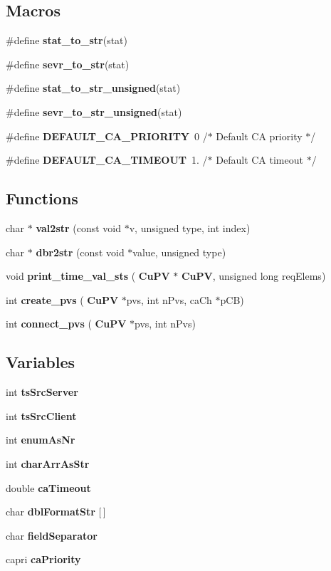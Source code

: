 \subsection*{Macros}
\begin{DoxyCompactItemize}
\item 
\#define \textbf{ stat\+\_\+to\+\_\+str}(stat)
\item 
\#define \textbf{ sevr\+\_\+to\+\_\+str}(stat)
\item 
\#define \textbf{ stat\+\_\+to\+\_\+str\+\_\+unsigned}(stat)
\item 
\#define \textbf{ sevr\+\_\+to\+\_\+str\+\_\+unsigned}(stat)
\item 
\#define \textbf{ D\+E\+F\+A\+U\+L\+T\+\_\+\+C\+A\+\_\+\+P\+R\+I\+O\+R\+I\+TY}~0  /$\ast$ Default CA priority $\ast$/
\item 
\#define \textbf{ D\+E\+F\+A\+U\+L\+T\+\_\+\+C\+A\+\_\+\+T\+I\+M\+E\+O\+UT}~1.     /$\ast$ Default CA timeout $\ast$/
\end{DoxyCompactItemize}
\subsection*{Functions}
\begin{DoxyCompactItemize}
\item 
char $\ast$ \textbf{ val2str} (const void $\ast$v, unsigned type, int index)
\item 
char $\ast$ \textbf{ dbr2str} (const void $\ast$value, unsigned type)
\item 
void \textbf{ print\+\_\+time\+\_\+val\+\_\+sts} (\textbf{ Cu\+PV} $\ast$\textbf{ Cu\+PV}, unsigned long req\+Elems)
\item 
int \textbf{ create\+\_\+pvs} (\textbf{ Cu\+PV} $\ast$pvs, int n\+Pvs, ca\+Ch $\ast$p\+CB)
\item 
int \textbf{ connect\+\_\+pvs} (\textbf{ Cu\+PV} $\ast$pvs, int n\+Pvs)
\end{DoxyCompactItemize}
\subsection*{Variables}
\begin{DoxyCompactItemize}
\item 
int \textbf{ ts\+Src\+Server}
\item 
int \textbf{ ts\+Src\+Client}
\item 
int \textbf{ enum\+As\+Nr}
\item 
int \textbf{ char\+Arr\+As\+Str}
\item 
double \textbf{ ca\+Timeout}
\item 
char \textbf{ dbl\+Format\+Str} [$\,$]
\item 
char \textbf{ field\+Separator}
\item 
capri \textbf{ ca\+Priority}
\end{DoxyCompactItemize}


